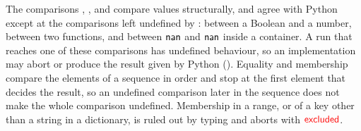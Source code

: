 The comparisons \pyinline{==}, \pyinline{!=},  and  compare values
structurally, and agree with Python
except at the comparisons left undefined by \PurePy{}: between a Boolean and a number, between two functions, and between $\mathsf{nan}$ and $\mathsf{nan}$ inside a container. A run that reaches one of these comparisons has undefined behaviour, so an
implementation may abort or produce the result given by Python ().
Equality and membership compare the elements of a sequence in order and stop at the first element that decides
the result, so an undefined comparison later in the sequence does not make the whole comparison undefined. Membership in a range, or of a key other than a string in a dictionary, is ruled out by typing and aborts with $\textcolor{red}{\mathsf{excluded}}$\speconly{ (\S\ref{aux:in})}.
